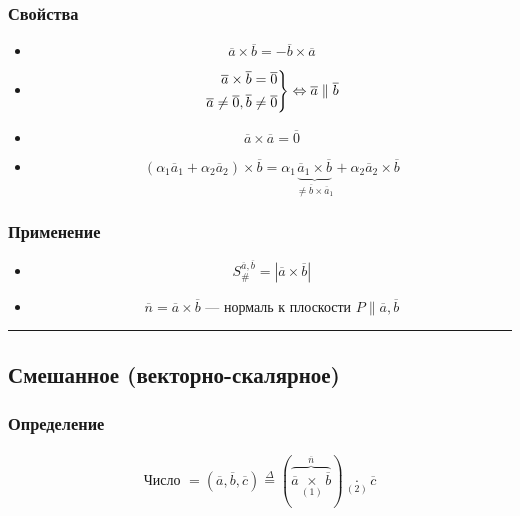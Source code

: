 \documentclass{article}
\newenvironment{rcases}
    {\left.\begin{aligned}}
    {\end{aligned}\right\rbrace}
\begin{document}
\subsubsection{Свойства}
\begin{itemize}
    \item 
    \[
    \overline{a} \times \overline{b} = -\overline{b} \times \overline{a}
    \]
    \item 
    \begin{align*} 
        \begin{rcases}
            \overline{a} \times \overline{b} = \overline{0} \\
            \overline{a} \neq \overline{0}, \overline{b} \neq \overline{0}    
        \end{rcases} \Leftrightarrow 
        \overline{a} \parallel \overline{b} 
    \end{align*}
    \item 
    \[
    \overline{a} \times \overline{a} = \overline{0}
    \]
    \item 
    \[
    \left( \alpha_1 \overline{a}_1 + \alpha_2 \overline{a}_2 \right) \times \overline{b} =
    \alpha_1 \underbrace{\overline{a}_1 \times \overline{b}}_{\neq \overline{b} \times \overline{a}_1} +
    \alpha_2 \overline{a}_2 \times \overline{b}
    \]
\end{itemize}

\subsubsection{Применение}
\begin{itemize}
    \item 
    \[
    S_{\#}^{\overline{a}, \overline{b}} = \left| \overline{a} \times \overline{b} \right|
    \]
    \item 
    \[
    \overline{n} = \overline{a} \times \overline{b} \text{ --- нормаль к плоскости } P \parallel \overline{a}, \overline{b}
    \]
\end{itemize}


\par\noindent\rule{\textwidth}{1pt}
\subsection{Смешанное (векторно-скалярное)}

\subsubsection{Определение}
\begin{gather*}
    \text{Число } = (\overline{a}, \overline{b}, \overline{c}) \overset{\Delta}{=}
    (\overbrace{\overline{a} \underset{(1)}{\times} \overline{b}}^{\overline{n}}) \underset{(2)}{\cdot} \overline{c}
\end{gather*}
\end{document}
